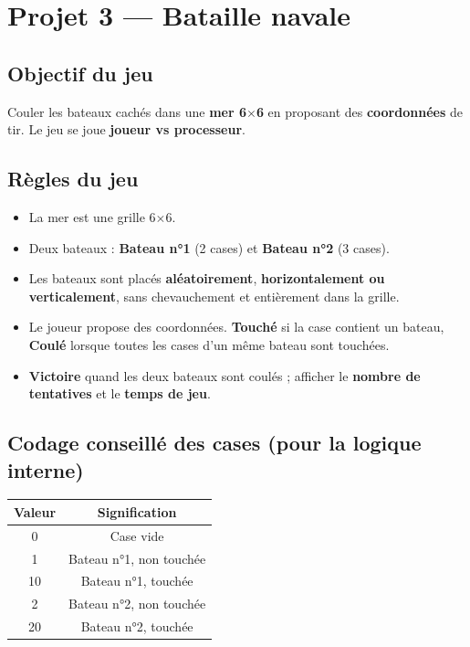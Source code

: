 \section{Projet 3 — Bataille navale}

\subsection*{Objectif du jeu}
Couler les bateaux cachés dans une \textbf{mer 6$\times$6} en proposant des \textbf{coordonnées} de tir. Le jeu se joue \textbf{joueur vs processeur}.

\subsection*{Règles du jeu}
\begin{itemize}
  \item La mer est une grille 6$\times$6.
  \item Deux bateaux : \textbf{Bateau n°1} (2 cases) et \textbf{Bateau n°2} (3 cases).
  \item Les bateaux sont placés \textbf{aléatoirement}, \textbf{horizontalement ou verticalement}, sans chevauchement et entièrement dans la grille.
  \item Le joueur propose des coordonnées. \textbf{Touché} si la case contient un bateau, \textbf{Coulé} lorsque toutes les cases d’un même bateau sont touchées.
  \item \textbf{Victoire} quand les deux bateaux sont coulés ; afficher le \textbf{nombre de tentatives} et le \textbf{temps de jeu}.
\end{itemize}

\subsection*{Codage conseillé des cases (pour la logique interne)}
\begin{center}
\begin{tabular}{|c|c|}
\hline
\textbf{Valeur} & \textbf{Signification} \\ \hline
0 & Case vide \\ \hline
1 & Bateau n°1, non touchée \\ \hline
10 & Bateau n°1, touchée \\ \hline
2 & Bateau n°2, non touchée \\ \hline
20 & Bateau n°2, touchée \\ \hline
\end{tabular}
\end{center}

